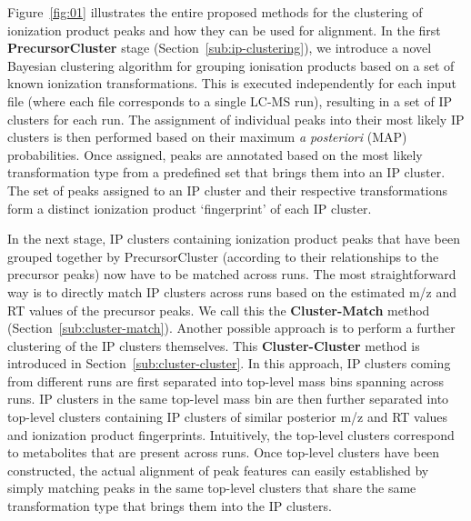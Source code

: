 Figure~\ref{fig:01} illustrates the entire proposed methods for the clustering of ionization product peaks and how they can be used for alignment. In the first \textbf{PrecursorCluster} stage (Section~\ref{sub:ip-clustering}), we introduce a novel Bayesian clustering algorithm for grouping ionisation products based on a set of known ionization transformations. This is executed independently for each input file (where each file corresponds to a single LC-MS run), resulting in a set of IP clusters for each run. The assignment of individual peaks into their most likely IP clusters is then performed based on their maximum \textit{a posteriori} (MAP) probabilities. Once assigned, peaks are annotated based on the most likely transformation type from a predefined set that brings them into an IP cluster. The set of peaks assigned to an IP cluster and their respective transformations form a distinct ionization product `fingerprint' of each IP cluster. 

In the next stage, IP clusters containing ionization product peaks that have been grouped together by PrecursorCluster (according to their relationships to the precursor peaks) now have to be matched across runs. The most straightforward way is to directly match IP clusters across runs based on the estimated m/z and RT values of the precursor peaks. We call this the \textbf{Cluster-Match} method (Section~\ref{sub:cluster-match}). Another possible approach is to perform a further clustering of the IP clusters themselves. This \textbf{Cluster-Cluster} method is introduced in Section~\ref{sub:cluster-cluster}. In this approach, IP clusters coming from different runs are first separated into top-level mass bins spanning across runs. IP clusters in the same top-level mass bin are then further separated into top-level clusters containing IP clusters of similar posterior m/z and RT values and ionization product fingerprints. Intuitively, the top-level clusters correspond to metabolites that are present across runs. Once top-level clusters have been constructed, the actual alignment of peak features can easily established by simply matching peaks in the same top-level clusters that share the same transformation type that brings them into the IP clusters.

